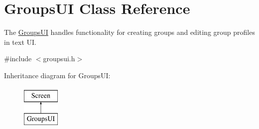 \hypertarget{classGroupsUI}{}\section{Groups\+UI Class Reference}
\label{classGroupsUI}


The \hyperlink{classGroupsUI}{Groups\+UI} handles functionality for creating groups and editing group profiles in text UI.  




{\ttfamily \#include $<$groupsui.\+h$>$}

Inheritance diagram for Groups\+UI\+:\begin{figure}[H]
\begin{center}
\leavevmode
\includegraphics[height=2.000000cm]{classGroupsUI}
\end{center}
\end{figure}
